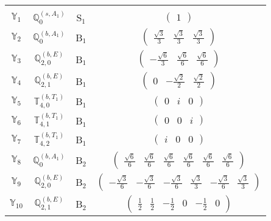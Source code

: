 \documentclass[fleqn,10pt,landscape]{article}
\begin{document}
\begin{itemize}
\begin{center}
\begin{longtable}{c|c|c|c}
 \hline \hline
\multicolumn{3}{r}{} \\ \endlastfoot

$ \mathbb{Y}_{1} $ & $\mathbb{Q}_{0}^{(s,A_{1})}$ & S$_{1}$ & $\begin{pmatrix} 1 \end{pmatrix}$ \\ \hline
$ \mathbb{Y}_{2} $ & $\mathbb{Q}_{0}^{(b,A_{1})}$ & B$_{1}$ & $\begin{pmatrix} \frac{\sqrt{3}}{3} & \frac{\sqrt{3}}{3} & \frac{\sqrt{3}}{3} \end{pmatrix}$ \\
$ \mathbb{Y}_{3} $ & $\mathbb{Q}_{2,0}^{(b,E)}$ & B$_{1}$ & $\begin{pmatrix} - \frac{\sqrt{6}}{3} & \frac{\sqrt{6}}{6} & \frac{\sqrt{6}}{6} \end{pmatrix}$ \\
$ \mathbb{Y}_{4} $ & $\mathbb{Q}_{2,1}^{(b,E)}$ & B$_{1}$ & $\begin{pmatrix} 0 & - \frac{\sqrt{2}}{2} & \frac{\sqrt{2}}{2} \end{pmatrix}$ \\
$ \mathbb{Y}_{5} $ & $\mathbb{T}_{4,0}^{(b,T_{1})}$ & B$_{1}$ & $\begin{pmatrix} 0 & i & 0 \end{pmatrix}$ \\
$ \mathbb{Y}_{6} $ & $\mathbb{T}_{4,1}^{(b,T_{1})}$ & B$_{1}$ & $\begin{pmatrix} 0 & 0 & i \end{pmatrix}$ \\
$ \mathbb{Y}_{7} $ & $\mathbb{T}_{4,2}^{(b,T_{1})}$ & B$_{1}$ & $\begin{pmatrix} i & 0 & 0 \end{pmatrix}$ \\ \hline
$ \mathbb{Y}_{8} $ & $\mathbb{Q}_{0}^{(b,A_{1})}$ & B$_{2}$ & $\begin{pmatrix} \frac{\sqrt{6}}{6} & \frac{\sqrt{6}}{6} & \frac{\sqrt{6}}{6} & \frac{\sqrt{6}}{6} & \frac{\sqrt{6}}{6} & \frac{\sqrt{6}}{6} \end{pmatrix}$ \\
$ \mathbb{Y}_{9} $ & $\mathbb{Q}_{2,0}^{(b,E)}$ & B$_{2}$ & $\begin{pmatrix} - \frac{\sqrt{3}}{6} & - \frac{\sqrt{3}}{6} & - \frac{\sqrt{3}}{6} & \frac{\sqrt{3}}{3} & - \frac{\sqrt{3}}{6} & \frac{\sqrt{3}}{3} \end{pmatrix}$ \\
$ \mathbb{Y}_{10} $ & $\mathbb{Q}_{2,1}^{(b,E)}$ & B$_{2}$ & $\begin{pmatrix} \frac{1}{2} & \frac{1}{2} & - \frac{1}{2} & 0 & - \frac{1}{2} & 0 \end{pmatrix}$ \\

\end{longtable}
\end{center}
\end{itemize}
\end{document}
